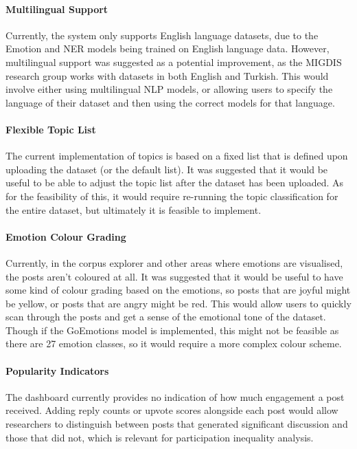 \documentclass[12pt, a4paper]{article}
\begin{document}
\paragraph{Multilingual Support}
Currently, the system only supports English language datasets, due to the Emotion and NER models being trained on English language data. However, multilingual support was suggested as a potential improvement, as the MIGDIS research group works with datasets in both English and Turkish. This would involve either using multilingual NLP models, or allowing users to specify the language of their dataset and then using the correct models for that language.

\paragraph{Flexible Topic List}
The current implementation of topics is based on a fixed list that is defined upon uploading the dataset (or the default list). It was suggested that it would be useful to be able to adjust the topic list after the dataset has been uploaded. As for the feasibility of this, it would require re-running the topic classification for the entire dataset, but ultimately it is feasible to implement.

\paragraph{Emotion Colour Grading}
Currently, in the corpus explorer and other areas where emotions are visualised, the posts aren't coloured at all. It was suggested that it would be useful to have some kind of colour grading based on the emotions, so posts that are joyful might be yellow, or posts that are angry might be red. This would allow users to quickly scan through the posts and get a sense of the emotional tone of the dataset. Though if the GoEmotions model is implemented, this might not be feasible as there are 27 emotion classes, so it would require a more complex colour scheme.

\paragraph{Popularity Indicators}
The dashboard currently provides no indication of how much engagement a post received. Adding reply counts or upvote scores alongside each post would allow researchers to distinguish between posts that generated significant discussion and those that did not, which is relevant for participation inequality analysis.
\end{document}
